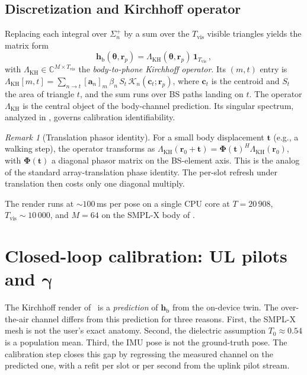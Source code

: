 \documentclass[journal,twocolumn,10pt]{IEEEtran}
\theoremstyle{plain}
\theoremstyle{definition}
\theoremstyle{remark}
\newtheorem{remark}[theorem]{Remark}
\newcommand{\rr}{\mathbf{r}}
\newcommand{\Phimat}{\mathbf{\Phi}}
\newcommand{\thetab}{\bm{\theta}}
\newcommand{\gammab}{\bm{\gamma}}
\newcommand{\hbody}{\bm{h}_{\mathrm{b}}}
\newcommand{\Tepskin}{T_{0}}
\newcommand{\Complex}{\mathbb{C}}
\begin{document}
\subsection{Discretization and Kirchhoff operator}

Replacing each integral over $\Sigma_n^{+}$ by a sum over the
$T_{\mathrm{vis}}$ visible triangles yields the matrix form
\begin{equation}\label{eq:Lambda-op}
\hbody(\thetab,\rr_p) = \Lambda_{\mathrm{KH}}(\thetab,\rr_p)\,
\bm{1}_{T_{\mathrm{vis}}} \,,
\end{equation}
with $\Lambda_{\mathrm{KH}} \in \Complex^{M \times T_{\mathrm{vis}}}$
the \emph{body-to-phone Kirchhoff operator}. Its $(m,t)$ entry is
$\Lambda_{\mathrm{KH}}[m,t] = \sum_{n \to t} [\bm{a}_n]_m \,
\beta_n\, S_t\, \mathcal{K}_n(\bm{c}_t;\rr_p)$, where $\bm{c}_t$
is the centroid and $S_t$ the area of triangle $t$, and the sum
runs over BS paths landing on $t$. The operator
$\Lambda_{\mathrm{KH}}$ is the central object of the body-channel
prediction. Its singular spectrum, analyzed in
, governs calibration identifiability.

\begin{remark}[Translation phasor identity]
For a small body displacement $\bm{t}$ (e.g., a walking step), the
operator transforms as $\Lambda_{\mathrm{KH}}(\rr_0 + \bm{t}) =
\Phimat(\bm{t})^{H}\Lambda_{\mathrm{KH}}(\rr_0)$, with $\Phimat(\bm{t})$
a diagonal phasor matrix on the BS-element axis. This is the analog
of the standard array-translation phase identity. The per-slot
refresh under translation then costs only one diagonal multiply.
\end{remark}

The render runs at $\sim\!100\,$ms per pose on a single CPU core
at $T = 20\,908$, $T_{\mathrm{vis}} \sim 10\,000$, and $M = 64$ on
the SMPL-X body of .


\section{Closed-loop calibration: UL pilots and \texorpdfstring{$\gammab$}{gamma}}\label{sec:closed-loop}

The Kirchhoff render of~ is a \emph{prediction}
of $\hbody$ from the on-device twin. The over-the-air channel
differs from this prediction for three reasons. First, the SMPL-X
mesh is not the user's exact anatomy. Second, the dielectric
assumption $\Tepskin\approx 0.54$ is a population mean. Third, the
IMU pose is not the ground-truth pose. The calibration step closes
this gap by regressing the measured channel on the predicted one,
with a refit per slot or per second from the uplink pilot stream.
\end{document}
